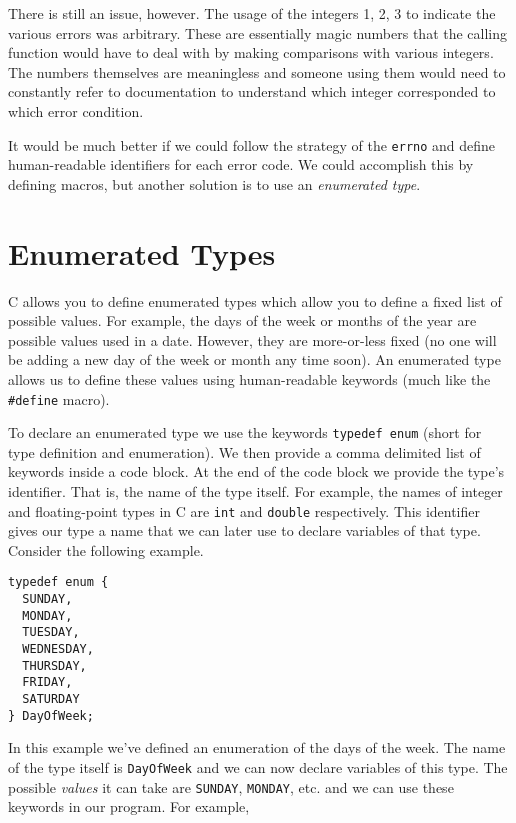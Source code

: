 There is still an issue, however.  The usage of the integers 1, 2, 3
to indicate the various errors was arbitrary.  These are essentially
\glspl{magic number} that the calling function would have to deal
with by making comparisons with various integers.  The numbers
themselves are meaningless and someone using them would 
need to constantly refer to documentation to understand which
integer corresponded to which error condition.

It would be much better if we could follow the strategy of the
\texttt{errno} and define human-readable identifiers 
for each error code.  We could accomplish this by defining
macros, but another solution is to use an \emph{enumerated
type}.

\section{Enumerated Types}

C allows you to define \glspl{enumerated type} which allow you to
define a fixed list of possible values.  For example, the days of the
week or months of the year are possible values used in a date.
However, they are more-or-less fixed (no one will be adding a new
day of the week or month any time soon).  An enumerated type
allows us to define these values using human-readable keywords
(much like the \texttt{#define} macro).  

To declare an enumerated type we use the keywords 
\texttt{typedef enum} (short for type definition
and enumeration).  We then provide a comma delimited
list of keywords inside a code block.  At the end of the
code block we provide the type's identifier.  That is, the
name of the type itself.  For example, the names of 
integer and floating-point types in C are \texttt{int} and 
\texttt{double} respectively.  This identifier gives
our type a name that we can later use to declare variables
of that type.  Consider the following example.

\begin{verbatim}
typedef enum {
  SUNDAY,
  MONDAY,
  TUESDAY,
  WEDNESDAY,
  THURSDAY,
  FRIDAY,
  SATURDAY
} DayOfWeek;
\end{verbatim}

In this example we've defined an enumeration of the days 
of the week.  The name of the type itself is \texttt{DayOfWeek}
and we can now declare variables of this type.  The possible 
\emph{values} it can take are \texttt{SUNDAY}, 
\texttt{MONDAY}, etc. and we can use these keywords 
in our program.  For example, 

